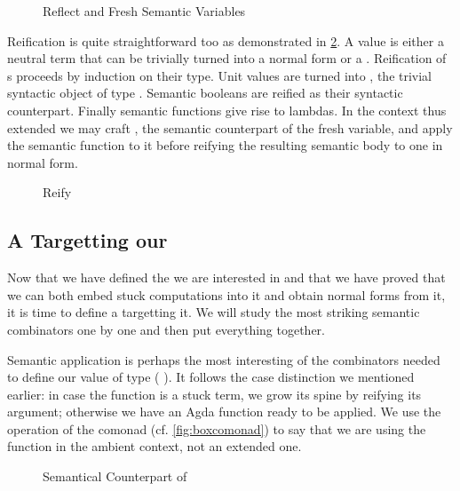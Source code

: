 \begin{figure}[h]
\caption{Reflect and Fresh Semantic Variables}\label{fig:bix:reflect}
\end{figure}

Reification is quite straightforward too as demonstrated in \cref{fig:bix:reify}.
A  value is
either a neutral term that can be trivially turned into a normal
form or a . Reification of s proceeds by induction
on their type. Unit values are turned into , the trivial
syntactic object of type . Semantic booleans are reified
as their syntactic counterpart. Finally semantic functions give rise
to lambdas. In the context thus extended we may craft , the
semantic counterpart of the fresh variable, and apply the semantic
function to it before reifying the resulting semantic body to one in
normal form.

\begin{figure}[h]
\caption{Reify}\label{fig:bix:reify}
\end{figure}

\subsection{A  Targetting our }

Now that we have defined the  we are interested in and that
we have proved that we can both embed stuck computations into it and
obtain normal forms from it, it is time to define a 
targetting it. We will study the most striking semantic combinators
one by one and then put everything together.

Semantic application is perhaps the most interesting of the combinators
needed to define our value of type (  ).
It follows the case distinction we mentioned earlier: in case the function
is a stuck term, we grow its spine by reifying its argument; otherwise we
have an Agda function ready to be applied. We use the  operation
of the  comonad (cf. \cref{fig:boxcomonad}) to say that we are using
the function in the ambient context, not an extended one.

\begin{figure}[h]
\caption{Semantical Counterpart of }
\end{figure}

